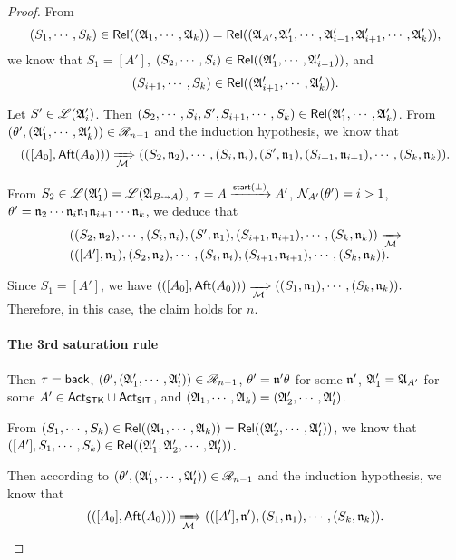 \begin{proof}
From 
%
$$(S_1, \cdots, S_k) \in \mathsf{Rel}(({\mathfrak{A} }_1, \cdots, {\mathfrak{A} }_k)) = \mathsf{Rel}(({\mathfrak{A} }_{A'}, {\mathfrak{A} }'_1, \cdots, {\mathfrak{A} }'_{i-1}, {\mathfrak{A} }'_{i+1}, \cdots, {\mathfrak{A} }'_k)),$$ 
%
we know that $S_1 = [A']$, $(S_2, \cdots, S_i) \in \mathsf{Rel}(({\mathfrak{A} }'_1, \cdots, {\mathfrak{A} }'_{i-1}))$, and 
$$(S_{i+1}, \cdots, S_k) \in \mathsf{Rel}(({\mathfrak{A} }'_{i+1}, \cdots, {\mathfrak{A} }'_k)).$$

Let $S' \in {\mathscr{L} }({\mathfrak{A} }'_i)$. Then $(S_2, \cdots, S_i, S', S_{i+1}, \cdots, S_k) \in \mathsf{Rel}({\mathfrak{A} }'_1, \cdots, {\mathfrak{A} }'_k)$.
From $(\theta', ({\mathfrak{A} }'_1, \cdots, {\mathfrak{A} }'_k)) \in \mathscr{R}_{n-1}$ and the induction hypothesis, we know that  
%
$$(([A_0], {\sf Aft}(A_0))) \xRightarrow[{\mathcal{M} }]{} ((S_2, \mathfrak{n}_2), \cdots, (S_i, \mathfrak{n}_i), (S', \mathfrak{n}_1), (S_{i+1}, \mathfrak{n}_{i+1}), \cdots, (S_k, \mathfrak{n}_k)).$$ 

From $S_2 \in {\mathscr{L} }({\mathfrak{A} }'_1) = {\mathscr{L} }({\mathfrak{A} }_{B\rightsquigarrow A})$,  $\tau = A \xrightarrow{{\mathsf{start} }(\bot)} A'$, $\mathcal{N}_{A'}(\theta') = i > 1$, 
$\theta' = \mathfrak{n}_2  \cdots  \mathfrak{n}_{i} \mathfrak{n}_1  \mathfrak{n}_{i+1}  \cdots  \mathfrak{n}_k$, we deduce that 
$$
\begin{array}{l}
((S_2, \mathfrak{n}_2), \cdots, (S_i, \mathfrak{n}_i), (S', \mathfrak{n}_1), (S_{i+1}, \mathfrak{n}_{i+1}), \cdots, (S_k, \mathfrak{n}_k)) \xrightarrow[{\mathcal{M} }]{} \\
(([A'], \mathfrak{n}_1), (S_2, \mathfrak{n}_2), \cdots, (S_i, \mathfrak{n}_i), (S_{i+1}, \mathfrak{n}_{i+1}), \cdots, (S_k, \mathfrak{n}_k)).
\end{array}
$$ 

Since $S_1 = [A']$, we have
$(([A_0], {\sf Aft}(A_0))) \xRightarrow[{\mathcal{M} }]{} ((S_1, \mathfrak{n}_1), \cdots, (S_k, \mathfrak{n}_k)).$
%
Therefore, in this case, the claim holds for $n$.


\paragraph*{The 3rd saturation rule} Then $\tau = {\mathsf{back} }$, $(\theta', ({\mathfrak{A} }'_1, \cdots, {\mathfrak{A} }'_l)) \in \mathscr{R}_{n-1}$,  $\theta' = \mathfrak{n}' \theta$ for some $\mathfrak{n}'$, ${\mathfrak{A} }'_1 = {\mathfrak{A} }_{A'}$ for some $A' \in {\sf Act}_{\sf STK}\cup {\sf Act}_{\sf SIT}$, and $({\mathfrak{A} }_1, \cdots, {\mathfrak{A} }_k) = ({\mathfrak{A} }'_2, \cdots, {\mathfrak{A} }'_l)$.

From $(S_1, \cdots, S_k) \in \mathsf{Rel}(({\mathfrak{A} }_1, \cdots, {\mathfrak{A} }_k)) = \mathsf{Rel}(({\mathfrak{A} }'_2, \cdots, {\mathfrak{A} }'_l))$, we know that $([A'], S_1, \cdots, S_k) \in \mathsf{Rel}(({\mathfrak{A} }'_1, {\mathfrak{A} }'_2, \cdots, {\mathfrak{A} }'_l))$. 

Then according to $(\theta', ({\mathfrak{A} }'_1, \cdots, {\mathfrak{A} }'_l)) \in \mathscr{R}_{n-1}$ and the induction hypothesis, we know that 
$$(([A_0], {\sf Aft}(A_0))) \xRightarrow[{\mathcal{M} }]{} (([A'], \mathfrak{n}'), (S_1, \mathfrak{n}_1), \cdots, (S_k, \mathfrak{n}_k)).$$ 


\end{proof}

